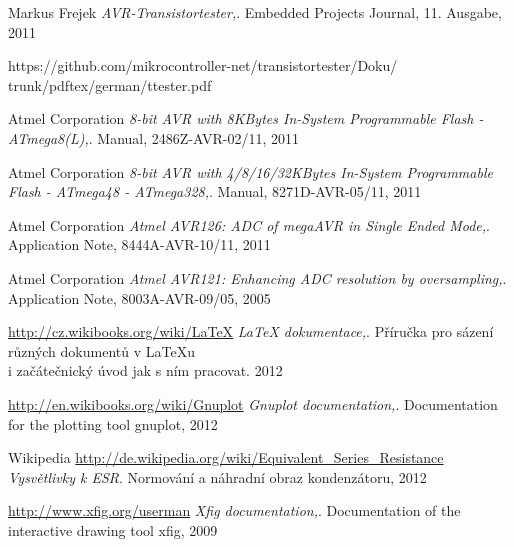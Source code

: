 \documentclass[pdftex,12pt,a4paper,oneside,english]{report}
\begin{document}












 
 
 
 
 
 






\begin{thebibliography}{99}

Markus Frejek
\emph{AVR-Transistortester,}.
Embedded Projects Journal,
11. Ausgabe,
2011

https://github.com/mikrocontroller-net/transistortester/Doku/
trunk/pdftex/german/ttester.pdf

Atmel Corporation
\emph{8-bit AVR with 8KBytes In-System Programmable Flash - ATmega8(L),}.
Manual,
2486Z-AVR-02/11,
2011

Atmel Corporation
\emph{8-bit AVR with 4/8/16/32KBytes In-System Programmable Flash - ATmega48 - ATmega328,}.
Manual,
8271D-AVR-05/11,
2011

Atmel Corporation
\emph{Atmel AVR126: ADC of megaAVR in Single Ended Mode,}.
Application Note,
8444A-AVR-10/11,
2011

Atmel Corporation
\emph{Atmel AVR121: Enhancing ADC resolution by oversampling,}.
Application Note,
8003A-AVR-09/05,
2005

\url{http://cz.wikibooks.org/wiki/LaTeX}
\emph{LaTeX dokumentace,}.
Příručka pro sázení různých dokumentů v LaTeXu\\
i  začátečnický úvod jak s ním pracovat.
2012

\url{http://en.wikibooks.org/wiki/Gnuplot}
\emph{Gnuplot documentation,}.
Documentation for the plotting tool gnuplot,
2012

Wikipedia
\url{http://de.wikipedia.org/wiki/Equivalent_Series_Resistance}
\emph{Vysvětlivky k ESR}.
Normování a náhradní obraz kondenzátoru,
2012

\url{http://www.xfig.org/userman}
\emph{Xfig documentation,}.
Documentation of the interactive drawing tool xfig,
2009


\end{thebibliography}
\end{document}
